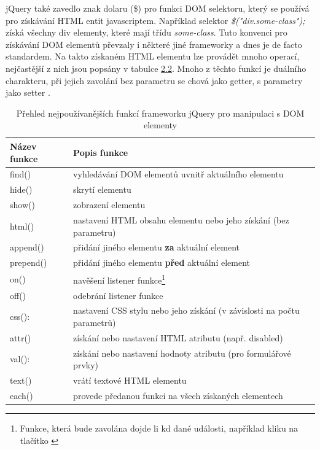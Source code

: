 jQuery také zavedlo znak dolaru (\$) pro funkci DOM selektoru, který se používá pro získávání HTML entit javascriptem. Například selektor \emph{\$("div.some-class");} získá všechny div elementy, které mají třídu \textit{some-class}. Tuto konvenci pro získávání DOM elementů převzaly i některé jiné frameworky a dnes je de facto standardem. Na takto získaném HTML elementu lze provádět mnoho operací, nejčastější z nich jsou popsány v tabulce \hyperref[tab:jquery]{2.2}. Mnoho z těchto funkcí je duálního charakteru, při jejich zavolání bez parametru se chová jako getter, s parametry jako setter \cite{jquery_book}.
\begin{table}[h]
\centering 
	\caption{Přehled nejpoužívanějších funkcí frameworku jQuery pro manipulaci s DOM elementy\label{tab:jquery}}
		\begin{tabular}{ |p{3cm}|p{7cm}| }
	\hline
	Název funkce & Popis funkce \\ \hline
	find() & vyhledávání DOM elementů uvnitř aktuálního elementu \\ \hline
hide() & skrytí elementu \\ \hline
show() & zobrazení elementu \\ \hline
html() & nastavení HTML obsahu elementu nebo jeho získání (bez parametru)\\ \hline
append() & přidání jiného elementu \textbf{za} aktuální element\\ \hline
prepend() & přidání jiného elementu \textbf{před} aktuální element \\ \hline
on() & navěšení listener funkce\footnote{Funkce, která bude zavolána dojde li kd dané události, například kliku na tlačítko \label{note:listener}} \\ \hline
off() & odebrání listener funkce\footnotemark[\value{footnote}] \\ \hline
css(): & nastavení CSS stylu nebo jeho získání (v závislosti na počtu parametrů) \\ \hline
attr() & získání nebo nastavení HTML atributu (např. disabled) \\ \hline
val(): & získání nebo nastavení hodnoty atributu (pro formulářové prvky) \\ \hline
text() & vrátí textové HTML elementu\\ \hline
each() & provede předanou funkci na všech získaných elementech \\ \hline
	\end{tabular}
	\label{tab:coffeescript}
\end{table}
\FloatBarrier


